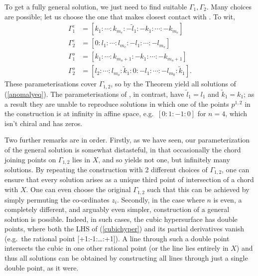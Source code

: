 \documentclass[prl,reprint,amsmath,amssymb,notitlepage]{revtex4-1}
\begin{document}
To get a fully general solution, we just need to find suitable
$\Gamma_1,\Gamma_2$. Many choices are possible; let us choose the one
that makes closest contact with
\cite{Costa_Dobrescu_Fox_2019}. To wit,
\begin{align}
\Gamma^{e}_{1}&=[k_1: \cdots: k_{m_e}:-\tilde
            l_1:-k_{1}:\cdots:-k_{m_e}]\nonumber \\
\Gamma^e_{2}&=[0:l_1: \cdots: l_{m_e}:-l_1:\cdots:-l_{m_e}] \nonumber \\
\Gamma^o_1 &=[k_1:\cdots:k_{m_o+1}:-k_1:\cdots:- k_{m_o+1}]\nonumber \\
\Gamma^o_{2}&=[l_2:\cdots: l_{m_o}:\tilde
              k_1:0:-l_1:\cdots:-l_{m_0}:\tilde k_1]. \nonumber
\end{align}
These parameterisations cover $\Gamma_{1,2}$, so by the
Theorem yield all
solutions of (\ref{anomalyeq}). The parameterisations of
\cite{Costa_Dobrescu_Fox_2019}, in contrast, have $\tilde l_1=l_1$
and $\tilde k_1=k_1$; as a result they are unable to reproduce
solutions in which one of the points $p^{1,2}$ in the construction is
at infinity in affine space, e.g.\ $[0:1:-1:0]$ for
$n=4$, which isn't chiral and has zeros.

Two further remarks are in order. Firstly, as we have seen, our parameterization of the
general solution is somewhat distasteful, in that occasionally the
chord joining points on $\Gamma_{1,2}$ lies in $X$, and so yields not
one, but infinitely many solutions. By repeating the construction with
2 different choices of $\Gamma_{1,2}$, one can ensure that every
solution arises as a unique third point of intersection of a chord
with $X$. One can even choose the original $\Gamma_{1,2}$ such that
this can be achieved by simply permuting the co-ordinates
$z_i$. Secondly, in the case where $n$ is even, a completely
different, and arguably even simpler, construction of a general solution is possible. Indeed, in
such cases, the cubic hypersurface has double points, where both the
LHS of  (\ref{cubichyper}) and its partial derivatives vanish
(e.g.\ the rational point [+1:-1:\dots:+1]). A
line through such a double point intersects the cubic in one other
rational point (or the line lies entirely in $X$) and thus all
solutions can be obtained by constructing all lines through just a single
double point, as it were.
\end{document}
